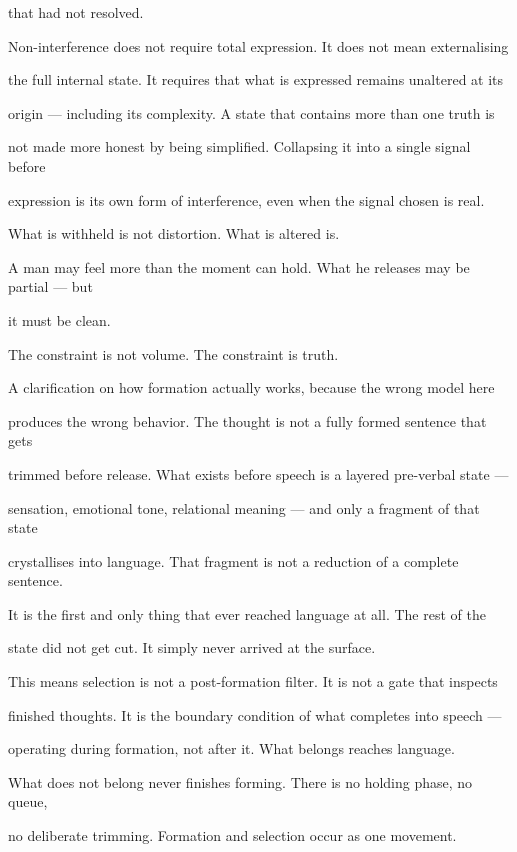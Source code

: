 that had not resolved.

\vspace{0.5em}

Non-interference does not require total expression. It does not mean externalising

the full internal state. It requires that what is expressed remains unaltered at its

origin --- including its complexity. A state that contains more than one truth is

not made more honest by being simplified. Collapsing it into a single signal before

expression is its own form of interference, even when the signal chosen is real.

What is withheld is not distortion. What is altered is.

A man may feel more than the moment can hold. What he releases may be partial --- but

it must be clean.

The constraint is not volume. The constraint is truth.

\vspace{0.5em}

A clarification on how formation actually works, because the wrong model here

produces the wrong behavior. The thought is not a fully formed sentence that gets

trimmed before release. What exists before speech is a layered pre-verbal state ---

sensation, emotional tone, relational meaning --- and only a fragment of that state

crystallises into language. That fragment is not a reduction of a complete sentence.

It is the first and only thing that ever reached language at all. The rest of the

state did not get cut. It simply never arrived at the surface.

This means selection is not a post-formation filter. It is not a gate that inspects

finished thoughts. It is the boundary condition of what completes into speech ---

operating during formation, not after it. What belongs reaches language.

What does not belong never finishes forming. There is no holding phase, no queue,

no deliberate trimming. Formation and selection occur as one movement.

